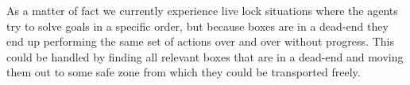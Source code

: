 
As a matter of fact we currently experience live lock situations where the agents try to solve goals in a specific order, but because boxes are in a dead-end they end up performing the same set of actions over and over without progress.
This could be handled by finding all relevant boxes that are in a dead-end and moving them out to some safe zone from which they could be transported freely.
